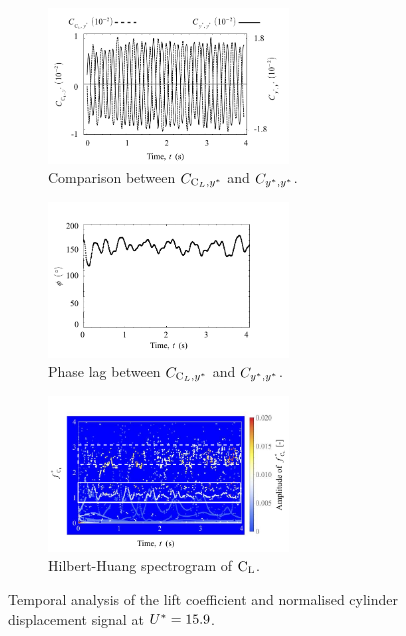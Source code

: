 \documentclass[oneside]{utmthesis}
\begin{document}
\begin{figure}[H]
  \centering
  \begin{subfigure}[h]{1\textwidth}
    \hspace{2.4cm}
    \includegraphics[width=0.7\textwidth]{figs/tempAnalysisTransition-a}
    \caption{Comparison between $C_{\text{C}_{L},y^{*}}$ and $C_{y^{*},y^{*}}$.}
    \label{fig:tempAnalysisTransition-a}
  \end{subfigure}

  \begin{subfigure}[h]{1\textwidth}
    \hspace{2.4cm}
    \includegraphics[width=0.7\textwidth]{figs/tempAnalysisTransition-b}
    \caption{Phase lag between $C_{\text{C}_{L},y^{*}}$ and $C_{y^{*},y^{*}}$.}
    \label{fig:tempAnalysisTransition-b}
  \end{subfigure}

  \begin{subfigure}[h]{1\textwidth}
    \hspace{2.4cm}
    \includegraphics[width=0.7\textwidth]{figs/tempAnalysisTransition-c}
    \caption{Hilbert-Huang spectrogram of $\text{C}_{\text{L}}$.}
    \label{fig:tempAnalysisTransition-c}
  \end{subfigure}
  \caption{Temporal analysis of the lift coefficient and normalised cylinder displacement signal at $U^{*} = 15.9$.}
  \label{fig:tempAnalysisTransition}
\end{figure}
\end{document}
